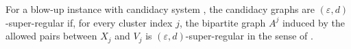 \begin{definition}
For a blow-up instance with candidacy system , the candidacy graphs are $(\varepsilon,d)$-super-regular if, for every cluster index $j$, the bipartite graph $A^j$ induced by the allowed pairs between $X_j$ and $V_j$ is $(\varepsilon,d)$-super-regular in the sense of .
\end{definition}
